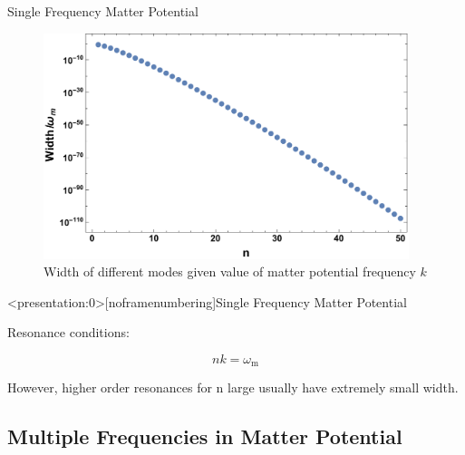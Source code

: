 \documentclass[9pt]{beamer}
\begin{document}
\begin{darkframes}
\begin{frame}{Single Frequency Matter Potential}
{\begin{tcolorbox}
\begin{figure}
\centering
\includegraphics[width=0.95\textwidth]{assets/width-n}
\caption*{\color{black}Width of different modes given value of matter potential frequency $k$}
\end{figure}
\end{tcolorbox}
}




\end{frame}



\begin{frame}<presentation:0>[noframenumbering]{Single Frequency Matter Potential}

Resonance conditions:

\begin{equation*}
    nk=\omega_{\mathrm m}
\end{equation*}

However, higher order resonances for n large usually have extremely small width.



\end{frame}



\subsection{Multiple Frequencies in Matter Potential}



\end{darkframes}
\end{document}

